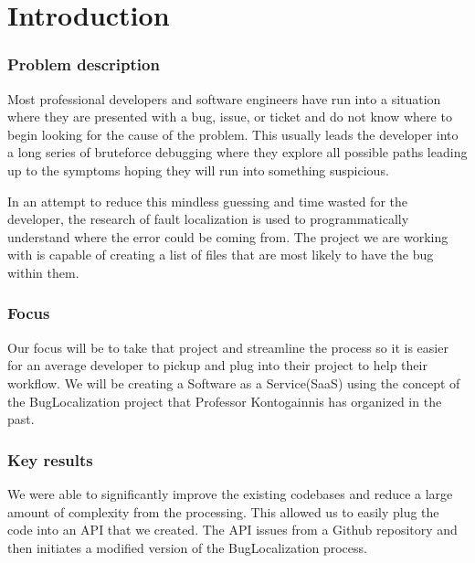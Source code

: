 \documentclass[12pt]{article}
\begin{document}
\hypertarget{introduction}{%
\section{Introduction}\label{introduction}}

\hypertarget{problem-description}{%
\subsubsection{Problem description}\label{problem-description}}

Most professional developers and software engineers have run into a
situation where they are presented with a bug, issue, or ticket and do
not know where to begin looking for the cause of the problem. This
usually leads the developer into a long series of bruteforce debugging
where they explore all possible paths leading up to the symptoms hoping
they will run into something suspicious.

In an attempt to reduce this mindless guessing and time wasted for the
developer, the research of fault localization is used to
programmatically understand where the error could be coming from. The
project we are working with is capable of creating a list of files that
are most likely to have the bug within them.

\hypertarget{focus}{%
\subsubsection{Focus}\label{focus}}

Our focus will be to take that project and streamline the process so it
is easier for an average developer to pickup and plug into their project
to help their workflow. We will be creating a Software as a
Service(SaaS) using the concept of the BugLocalization project that
Professor Kontogainnis has organized in the past.

\hypertarget{key-results}{%
\subsubsection{Key results}\label{key-results}}

We were able to significantly improve the existing codebases and reduce
a large amount of complexity from the processing. This allowed us to
easily plug the code into an API that we created. The API issues from a
Github repository and then initiates a modified version of the
BugLocalization process.
\end{document}
